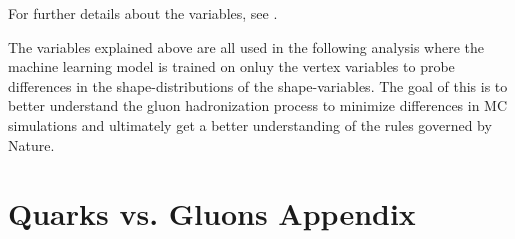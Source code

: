 \documentclass[a4paper, twoside, nobib]{tufte-book}
\begin{document}
For further details about the variables, see \citet{Armstrong1998hy}. 

The variables explained above are all used in the following analysis where the machine learning model is trained on onluy the vertex variables to probe differences in the shape-distributions of the shape-variables. The goal of this is to better understand the gluon hadronization process to minimize differences in MC simulations and ultimately get a better understanding of the rules governed by Nature.  











\appendix

% 


\chapter{Quarks vs. Gluons Appendix}


\backmatter


% 


\printindex
\end{document}
